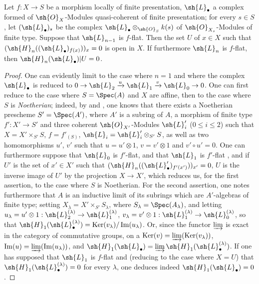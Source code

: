 \begin{proposition}[12.3.3]
\label{IV.12.3.3}
Let $f:X\to S$ be a morphism locally of finite presentation, $\sh{L}_\bullet$ a complex formed of $\sh{O}_X$-Modules quasi-coherent of finite presentation; for every $s\in S$, let $(\sh{L}_\bullet)_s$ be the complex $\sh{L}_\bullet\otimes_{\sh{O}_S}k(s)$ of $\sh{O}_{X_s}$-Modules of finite type.
Suppose that $\sh{L}_{n-1}$ is $f$-flat.
Then the set $U$ of $x\in X$ such that $(\sh{H}_n((\sh{L}_\bullet)_{f(x)}))_x=0$ is open in $X$.
If furthermore $\sh{L}_n$ is $f$-flat, then $\sh{H}_n(\sh{L}_\bullet)|U=0$.
\end{proposition}

\begin{proof}
One can evidently limit to the case where $n=1$ and where the complex $\sh{L}_\bullet$ is reduced to $0\to\sh{L}_2\xrightarrow{u}\sh{L}_1\xrightarrow{v}\sh{L}_0\to 0$.
One can first reduce to the case where $S=\Spec(A)$ and $X$
are affine, then to the case where $S$ is \emph{Noetherian}; indeed, by  and , one knows that there exists a Noetherian prescheme $S'=\Spec(A')$, where $A'$ is a subring of $A$, a morphism of finite type $f':X'\to S'$ and three coherent $\sh{O}_{X'}$-Modules $\sh{L}_i'$ ($0\leqslant i\leqslant 2$) such that $X=X'\times_{S'}S$, $f=f'_{(S)}$, $\sh{L}_i=\sh{L}_i'\otimes_{S'}S$, as well as two homomorphisms $u'$, $v'$ such that $u=u'\otimes 1$, $v=v'\otimes 1$ and $v'\circ u'=0$.
One can furthermore suppose that $\sh{L}_0$ is $f'$-flat, and that $\sh{L}_1$ is $f'$-flat , and if $U'$ is the set of $x'\in X'$ such that $(\sh{H}_n((\sh{L}_\bullet')_{f'(x')}))_{x'}=0$, $U$ is the inverse image of $U'$ by the projection $X\to X'$, which reduces us, for the first assertion, to the case where $S$ is Noetherian.
For the second assertion, one notes furthermore that $A$ is an inductive limit of its subrings which are $A'$-algebras of finite type; setting $X_\lambda=X'\times_{S'}S_\lambda$, where $S_\lambda=\Spec(A_\lambda)$, and letting $u_\lambda=u'\otimes 1:\sh{L}_2^{(\lambda)}\to\sh{L}_1^{(\lambda)}$, $v_\lambda=v'\otimes 1:\sh{L}_1^{(\lambda)}\to\sh{L}_0^{(\lambda)}$, so that $\sh{H}_1(\sh{L}_\bullet^{(\lambda)})=\operatorname{Ker}(v_\lambda)/\operatorname{Im}(u_\lambda)$.
Or, since the functor $\varinjlim$ is exact in the category of commutative groups, on a $\operatorname{Ker}(v)=\varinjlim(\operatorname{Ker}(v_\lambda))$, $\operatorname{Im}(u)=\varinjlim(\operatorname{Im}(u_\lambda))$, and $\sh{H}_1(\sh{L}_\bullet)=\varinjlim\sh{H}_1(\sh{L}_\bullet^{(\lambda)})$.
If one has supposed that $\sh{L}_1$ is $f$-flat and (reducing to the case where $X=U$) that $\sh{H}_1(\sh{L}_\bullet^{(\lambda)})=0$ for every $\lambda$, one deduces indeed $\sh{H}_1(\sh{L}_\bullet)=0$.


\end{proof}
